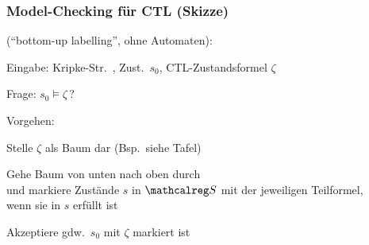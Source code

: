 \begin{frame}
  \frametitle{Model-Checking für CTL (Skizze)}

   ("`bottom-up labelling"', ohne Automaten):

  \par\bigskip
  Eingabe: Kripke-Str.\ \calS, Zust.\ $s_0$, CTL-Zustandsformel $\zeta$
  \par
  Frage: $s_0 \models \zeta$\,?
  
  \par\bigskip
  Vorgehen:
  \begin{Itemize}
    \item<2->
      Stelle $\zeta$ als Baum dar\hspace*{\fill} (Bsp.\ siehe Tafel) \Tafel
    \item<3->
      Gehe Baum von unten nach oben durch\\
      und markiere Zustände $s$ in $\calS$ mit der jeweiligen Teilformel,\\
      wenn sie in $s$ erfüllt ist \TafelForts
    \item<4->
      Akzeptiere gdw.\ $s_0$ mit $\zeta$ markiert ist
  \end{Itemize}

  \par\bigskip

\end{frame}

